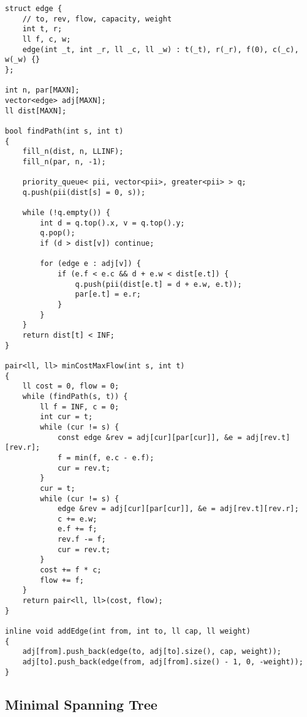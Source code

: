 \documentclass{article}
\begin{document}
\begin{lstlisting}
struct edge {
	// to, rev, flow, capacity, weight
	int t, r;
	ll f, c, w;
	edge(int _t, int _r, ll _c, ll _w) : t(_t), r(_r), f(0), c(_c), w(_w) {}
};

int n, par[MAXN];
vector<edge> adj[MAXN];
ll dist[MAXN];

bool findPath(int s, int t)
{
	fill_n(dist, n, LLINF);
	fill_n(par, n, -1);

	priority_queue< pii, vector<pii>, greater<pii> > q;
	q.push(pii(dist[s] = 0, s));

	while (!q.empty()) {
		int d = q.top().x, v = q.top().y;
		q.pop();
		if (d > dist[v]) continue;

		for (edge e : adj[v]) {
			if (e.f < e.c && d + e.w < dist[e.t]) {
				q.push(pii(dist[e.t] = d + e.w, e.t));
				par[e.t] = e.r;
			}
		}
	}
	return dist[t] < INF;
}

pair<ll, ll> minCostMaxFlow(int s, int t)
{
	ll cost = 0, flow = 0;
	while (findPath(s, t)) {
		ll f = INF, c = 0;
		int cur = t;
		while (cur != s) {
			const edge &rev = adj[cur][par[cur]], &e = adj[rev.t][rev.r];
			f = min(f, e.c - e.f);
			cur = rev.t;
		}
		cur = t;
		while (cur != s) {
			edge &rev = adj[cur][par[cur]], &e = adj[rev.t][rev.r];
			c += e.w;
			e.f += f;
			rev.f -= f;
			cur = rev.t;
		}
		cost += f * c;
		flow += f;
	}
	return pair<ll, ll>(cost, flow);
}

inline void addEdge(int from, int to, ll cap, ll weight)
{
	adj[from].push_back(edge(to, adj[to].size(), cap, weight));
	adj[to].push_back(edge(from, adj[from].size() - 1, 0, -weight));
}
\end{lstlisting}

\subsection{Minimal Spanning Tree}

\begin{comment}
\subsubsection{Prim $\mathcal{O}((E + V) \log V)$}

\begin{lstlisting}
// minimum spanning forest actually...
vector<pii> edges[MAXN]; // or set
int dist[MAXN];
bool done[MAXN];

ll prim(int n) {
	fill_n(dist, n, INF);
	fill_n(done, n, false);
	ll ret = 0, trees = 0;
	set<pii> q; // (to MST, vertex)
	for (int i = 0; i < n; i++) {
		if (done[i]) continue;
		trees++;
		q.insert(pii(dist[i] = 0, i));
		while (!q.empty()) {
			ret += q.begin()->first;
			int cur = q.begin()->second;
			q.erase(q.begin());
			done[cur] = true;
			for (pii pr : edges[cur]) {
				if (!done[pr.x] && pr.y < dist[pr.x]) {
					q.erase(pii(dist[pr.x], pr.x));
					dist[pr.x] = pr.y;
					q.insert(pii(dist[pr.x], pr.x));
				}
			}
		}
	}
	// if (trees > 1) return -1; // forest
	return ret;
}
\end{lstlisting}
\end{comment}
\end{document}
